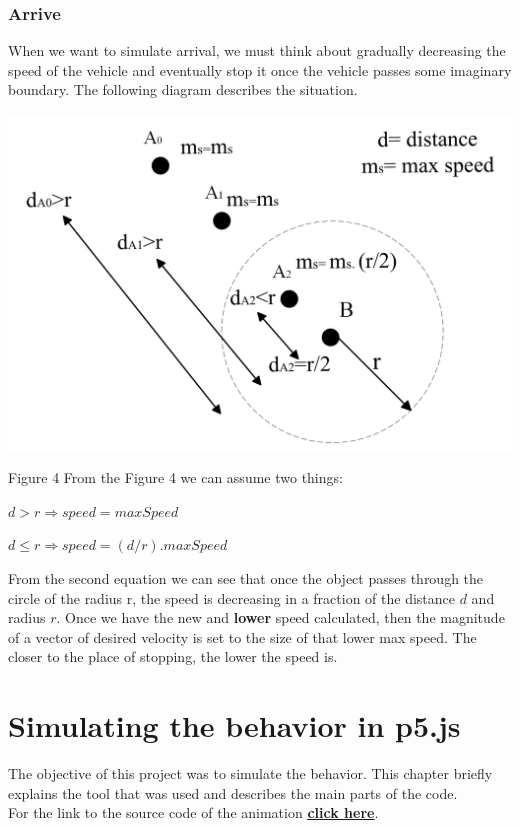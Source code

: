 \documentclass[10pt,twoside,english,a4paper]{article}
\begin{document}
\subsubsection{Arrive} \label{arrive}

When we want to simulate arrival, we must think about gradually 
decreasing the speed of the vehicle and eventually stop it once the 
vehicle passes some imaginary boundary. The following diagram describes 
the situation. 

\includegraphics[scale=0.25]{diagram_radius.png}\par
Figure 4
\bigbreak
From the Figure 4 we can assume two things: 

\begin{center}
$d>r 	\Rightarrow speed = maxSpeed$ \par 
$d \leq r \Rightarrow speed = (d/r)  . maxSpeed$ 
\end{center} 

From the second equation we can see that once the object passes through
the circle of the radius r, the speed is decreasing in a fraction of 
the distance $d$ and radius $r$. Once we have the new and \textbf{lower} 
speed calculated, then the magnitude of a vector of desired velocity is set
to the size of that lower max speed. The closer to the place of stopping,
the lower the speed is.

\section{Simulating the behavior in p5.js} \label{simulation} 

The objective of this project was to simulate the behavior. This chapter briefly
explains the tool that was used and describes the main parts of the code.\\
For the link to the source code of the animation \textbf{\underline{\href{https://editor.p5js.org/RichardCernansky/sketches/E0zAXshWw}{click here}}}.
\end{document}

